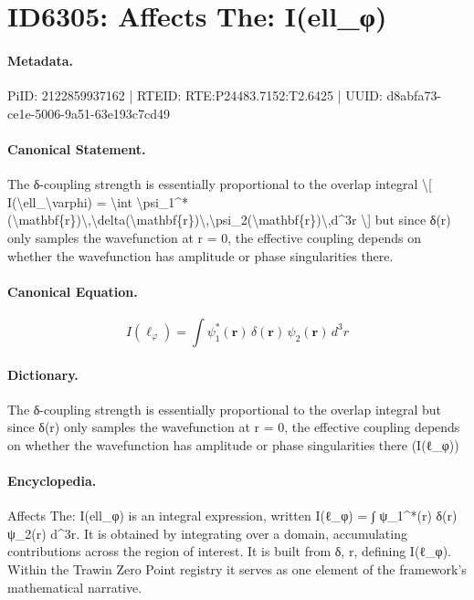 \section*{ID6305: Affects The: I(ell\_φ)}
\paragraph{Metadata.}
PiID: 2122859937162 | RTEID: RTE:P24483.7152:T2.6425 | UUID: d8abfa73-ce1e-5006-9a51-63e193c7cd49

\paragraph{Canonical Statement.}
The δ-coupling strength is essentially proportional to the overlap integral \textbackslash{}[ I(\textbackslash{}ell\_\textbackslash{}varphi) = \textbackslash{}int \textbackslash{}psi\_1\textasciicircum{}*(\textbackslash{}mathbf\{r\})\textbackslash{},\textbackslash{}delta(\textbackslash{}mathbf\{r\})\textbackslash{},\textbackslash{}psi\_2(\textbackslash{}mathbf\{r\})\textbackslash{},d\textasciicircum{}3r \textbackslash{}] but since δ(r) only samples the wavefunction at r = 0, the effective coupling depends on whether the wavefunction has amplitude or phase singularities there.

\paragraph{Canonical Equation.}
\[
I(\ell_\varphi) = \int \psi_1^*(\mathbf{r})\,\delta(\mathbf{r})\,\psi_2(\mathbf{r})\,d^3r
\]

\paragraph{Dictionary.}
The δ-coupling strength is essentially proportional to the overlap integral but since δ(r) only samples the wavefunction at r = 0, the effective coupling depends on whether the wavefunction has amplitude or phase singularities there (I(ℓ\_φ))

\paragraph{Encyclopedia.}
Affects The: I(ell\_φ) is an integral expression, written I(ℓ\_φ) = ∫ ψ\_1\textasciicircum{}*(r) δ(r) ψ\_2(r) d\textasciicircum{}3r. It is obtained by integrating over a domain, accumulating contributions across the region of interest. It is built from δ, r, defining I(ℓ\_φ). Within the Trawin Zero Point registry it serves as one element of the framework's mathematical narrative.
